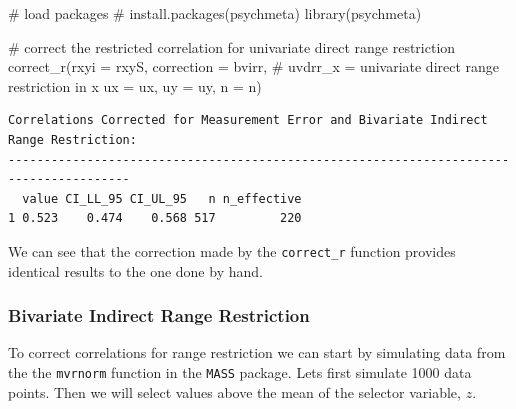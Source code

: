 \documentclass[
  letterpaper,
  DIV=11,
  numbers=noendperiod]{scrreprt}
\newenvironment{Shaded}{\begin{snugshade}}{\end{snugshade}}
\newcommand{\AttributeTok}[1]{\textcolor[rgb]{0.40,0.45,0.13}{#1}}
\newcommand{\CommentTok}[1]{\textcolor[rgb]{0.37,0.37,0.37}{#1}}
\newcommand{\FunctionTok}[1]{\textcolor[rgb]{0.28,0.35,0.67}{#1}}
\newcommand{\NormalTok}[1]{\textcolor[rgb]{0.00,0.23,0.31}{#1}}
\newcommand{\StringTok}[1]{\textcolor[rgb]{0.13,0.47,0.30}{#1}}
\begin{document}
\begin{Shaded}
\begin{Highlighting}[]
\CommentTok{\# load packages}
\CommentTok{\# install.packages(\textquotesingle{}psychmeta\textquotesingle{})}
\FunctionTok{library}\NormalTok{(psychmeta)}

\CommentTok{\# correct the restricted correlation for univariate direct range restriction}
\FunctionTok{correct\_r}\NormalTok{(}\AttributeTok{rxyi =}\NormalTok{ rxyS,}
          \AttributeTok{correction =} \StringTok{\textquotesingle{}bvirr\textquotesingle{}}\NormalTok{,  }\CommentTok{\# uvdrr\_x = univariate direct range restriction in x}
          \AttributeTok{ux =}\NormalTok{ ux,}
          \AttributeTok{uy =}\NormalTok{ uy,}
          \AttributeTok{n =}\NormalTok{ n)}
\end{Highlighting}
\end{Shaded}

\begin{verbatim}
Correlations Corrected for Measurement Error and Bivariate Indirect Range Restriction:
---------------------------------------------------------------------------------------
  value CI_LL_95 CI_UL_95   n n_effective
1 0.523    0.474    0.568 517         220
\end{verbatim}

We can see that the correction made by the \texttt{correct\_r} function
provides identical results to the one done by hand.

\hypertarget{bivariate-indirect-range-restriction}{%
\subsubsection*{Bivariate Indirect Range
Restriction}\label{bivariate-indirect-range-restriction}}

To correct correlations for range restriction we can start by simulating
data from the the \texttt{mvrnorm} function in the \texttt{MASS}
package. Lets first simulate 1000 data points. Then we will select
values above the mean of the selector variable, \(z\).
\end{document}
